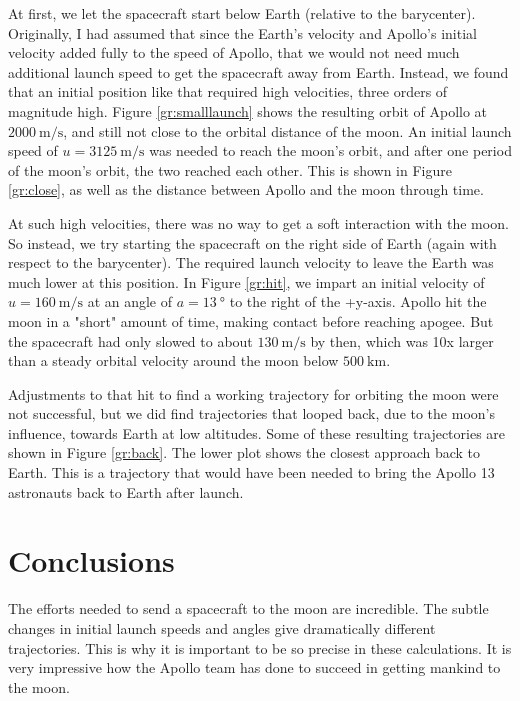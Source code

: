 \documentclass[aps,prl,twocolumn,superscriptaddress]{revtex4-1}
\begin{document}
At first, we let the spacecraft start below Earth (relative to the barycenter). Originally, I had assumed that since the Earth's velocity and Apollo's initial velocity added fully to the speed of Apollo, that we would not need much additional launch speed to get the spacecraft away from Earth. Instead, we found that an initial position like that required high velocities, three orders of magnitude high. Figure \ref{gr:smalllaunch} shows the resulting orbit of Apollo at $\SI{2000}{\m\per\s}$, and still not close to the orbital distance of the moon. An initial launch speed of $u = \SI{3125}{\m\per\s}$ was needed to reach the moon's orbit, and after one period of the moon's orbit, the two reached each other. This is shown in Figure \ref{gr:close}, as well as the distance between Apollo and the moon through time.

At such high velocities, there was no way to get a soft interaction with the moon. So instead, we try starting the spacecraft on the right side of Earth (again with respect to the barycenter). The required launch velocity to leave the Earth was much lower at this position. In Figure \ref{gr:hit}, we impart an initial velocity of $u = \SI{160}{\m\per\s}$ at an angle of $a = \SI{13}{\degree}$ to the right of the +y-axis. Apollo hit the moon in a "short" amount of time, making contact before reaching apogee. But the spacecraft had only slowed to about $\SI{130}{\m\per\s}$ by then, which was 10x larger than a steady orbital velocity around the moon below $\SI{500}{\km}$. 

Adjustments to that hit to find a working trajectory for orbiting the moon were not successful, but we did find trajectories that looped back, due to the moon's influence, towards Earth at low altitudes. Some of these resulting trajectories are shown in Figure \ref{gr:back}. The lower plot shows the closest approach back to Earth. This is a trajectory that would have been needed to bring the Apollo 13 astronauts back to Earth after launch. 

\section{Conclusions}
The efforts needed to send a spacecraft to the moon are incredible. The subtle changes in initial launch speeds and angles give dramatically different trajectories. This is why it is important to be so precise in these calculations. It is very impressive how the Apollo team has done to succeed in getting mankind to the moon.
\end{document}
